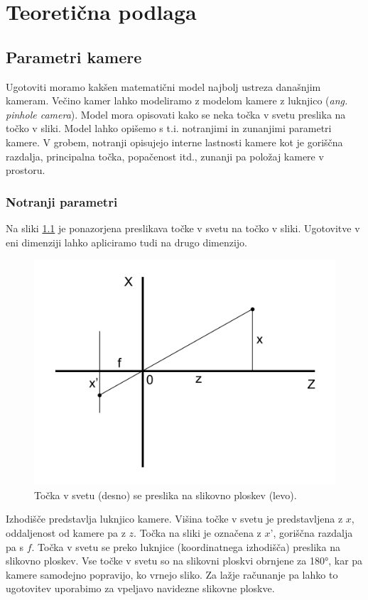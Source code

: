 \documentclass[a4paper, 12pt]{book}
\begin{document}
\chapter{Teoretična podlaga}
\section{Parametri kamere}\label{parametri}
Ugotoviti moramo kakšen matematični model najbolj ustreza današnjim kameram. Večino kamer lahko modeliramo z modelom kamere z luknjico (\emph{ang. pinhole camera}). Model mora opisovati kako se neka točka v svetu preslika na točko v sliki. Model lahko opišemo s t.i. notranjimi in zunanjimi parametri kamere. V grobem, notranji opisujejo interne lastnosti kamere kot je goriščna razdalja, principalna točka, popačenost itd., zunanji pa položaj kamere v prostoru.

\subsection{Notranji parametri}
Na sliki \ref{similar1} je ponazorjena preslikava točke v svetu na točko v sliki. Ugotovitve v eni dimenziji lahko apliciramo tudi na drugo dimenzijo. 

\begin{figure}[H]
\centering
\includegraphics[width=\textwidth,height=\textheight,keepaspectratio]{similar_triangles_1.png}
\caption{Točka v svetu (desno) se preslika na slikovno ploskev (levo).}
\label{similar1}
\end{figure}

Izhodišče predstavlja luknjico kamere. Višina točke v svetu je predstavljena z $x$, oddaljenost od kamere pa z $z$. Točka na sliki je označena z $x’$, goriščna razdalja pa s $f$. Točka v svetu se preko luknjice (koordinatnega izhodišča) preslika na slikovno ploskev. Vse točke v svetu so na slikovni ploskvi obrnjene za 180°, kar pa kamere samodejno popravijo, ko vrnejo sliko. Za lažje računanje pa lahko to ugotovitev uporabimo za vpeljavo navidezne slikovne ploskve. 
\end{document}
